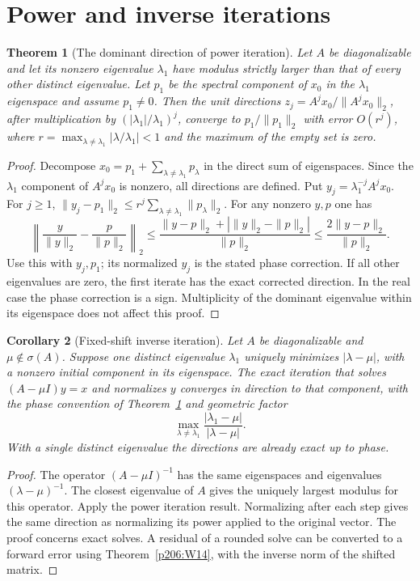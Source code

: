 \documentclass[11pt,oneside,openany]{book}
\theoremstyle{plain}
\newtheorem{theorem}{Theorem}[chapter]
\newtheorem{corollary}[theorem]{Corollary}
\theoremstyle{definition}
\theoremstyle{remark}
\begin{document}
\pagebreak
\section{Power and inverse iterations}

\begin{theorem}[The dominant direction of power iteration]
\label{p206:W44}
Let \(A\) be diagonalizable and let its nonzero eigenvalue
\(\lambda_1\) have modulus strictly larger than that of every
other distinct eigenvalue. Let \(p_1\) be the spectral component
of \(x_0\) in the \(\lambda_1\) eigenspace and assume \(p_1\ne0\).
Then the unit directions \(z_j=A^jx_0/\|A^jx_0\|_2\),
after multiplication by \((|\lambda_1|/\lambda_1)^j\),
converge to \(p_1/\|p_1\|_2\) with error \(O(r^j)\), where
\(r=\max_{\lambda\ne\lambda_1}|\lambda/\lambda_1|<1\)
and the maximum of the empty set is zero.
\end{theorem}
\begin{proof}
Decompose \(x_0=p_1+\sum_{\lambda\ne\lambda_1}p_\lambda\)
in the direct sum of eigenspaces. Since the \(\lambda_1\) component
of \(A^jx_0\) is nonzero, all directions are defined.
Put \(y_j=\lambda_1^{-j}A^jx_0\). For \(j\ge1\),
\(\|y_j-p_1\|_2\le r^j\sum_{\lambda\ne\lambda_1}\|p_\lambda\|_2\).
For any nonzero \(y,p\) one has
\[
 \left\|\frac{y}{\|y\|_2}-\frac{p}{\|p\|_2}\right\|_2
  \le \frac{\|y-p\|_2+|\|y\|_2-\|p\|_2|}{\|p\|_2}
  \le \frac{2\|y-p\|_2}{\|p\|_2}.
\]
Use this with \(y_j,p_1\); its normalized \(y_j\) is the stated
phase correction. If all other eigenvalues are zero, the first
iterate has the exact corrected direction. In the real case the
phase correction is a sign. Multiplicity of the dominant
eigenvalue within its eigenspace does not affect this proof.
\end{proof}

\begin{corollary}[Fixed-shift inverse iteration]\label{p206:W45}
Let \(A\) be diagonalizable and \(\mu\notin\sigma(A)\).
Suppose one distinct eigenvalue \(\lambda_1\) uniquely minimizes
\(|\lambda-\mu|\), with a nonzero initial component in its
eigenspace. The exact iteration that solves
\((A-\mu I)y=x\) and normalizes \(y\) converges in direction
to that component, with the phase convention of
Theorem~\ref{p206:W44} and geometric factor
\[
       \max_{\lambda\ne\lambda_1}
                    \frac{|\lambda_1-\mu|}{|\lambda-\mu|}.
\]
With a single distinct eigenvalue the directions are already exact
up to phase.
\end{corollary}
\begin{proof}
The operator \((A-\mu I)^{-1}\) has the same eigenspaces and
eigenvalues \((\lambda-\mu)^{-1}\). The closest eigenvalue
of \(A\) gives the uniquely largest modulus for this operator.
Apply the power iteration result. Normalizing after each step
gives the same direction as normalizing its power applied to
the original vector. The proof concerns exact solves.
A residual of a rounded solve can be converted to a forward error
using Theorem~\ref{p206:W14}, with the inverse norm of the shifted
matrix.
\end{proof}
\end{document}
